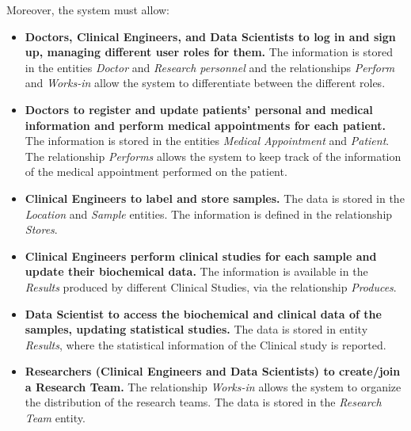 Moreover, the system must allow: 
\begin{itemize}
    \item \textbf{Doctors, Clinical Engineers, and Data Scientists to log in and sign up, managing different user roles for them.} The information is stored in the entities \emph{Doctor} and \emph{Research personnel} and the relationships \emph{Perform} and \emph{Works-in} allow the system to differentiate between the different roles.
    \item \textbf{Doctors to register and update patients' personal and medical information and perform medical appointments for each patient.} The information is stored in the entities \emph{Medical Appointment} and \emph{Patient}. The relationship \emph{Performs} allows the system to keep track of the information of the medical appointment performed on the patient.
    \item \textbf{Clinical Engineers to label and store samples.} The data is stored in the \emph{Location} and \emph{Sample} entities. The information is defined in the relationship \emph{Stores}.
    \item \textbf{Clinical Engineers perform clinical studies for each sample and update their biochemical data.} The information is available in the \emph{Results} produced by different Clinical Studies, via the relationship \emph{Produces}.
    \item \textbf{Data Scientist to access the biochemical and clinical data of the samples, updating statistical studies.} The data is stored in entity \emph{Results}, where the statistical information of the Clinical study is reported.
    \item \textbf{Researchers (Clinical Engineers and Data Scientists) to create/join a Research Team.} The relationship \emph{Works-in} allows the system to organize the distribution of the research teams. The data is stored in the \emph{Research Team} entity.
\end{itemize}